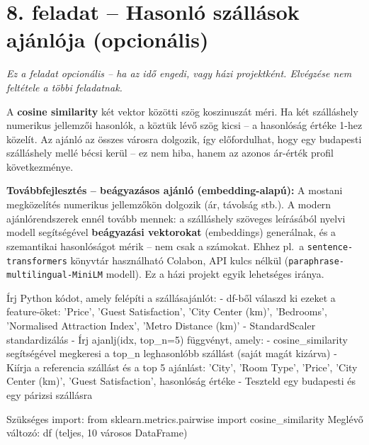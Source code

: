\documentclass[11pt,a4paper]{article}
\begin{document}
\section{8. feladat -- Hasonló szállások ajánlója \textnormal{\small(opcionális)}}

\noindent\textit{Ez a feladat opcionális -- ha az idő engedi, vagy házi projektként. Elvégzése nem feltétele a többi feladatnak.}

\smallskip
\noindent A \textbf{cosine similarity} két vektor közötti szög koszinuszát méri.
Ha két szálláshely numerikus jellemzői hasonlók,
a köztük lévő szög kicsi -- a hasonlóság értéke 1-hez közelít.
Az ajánló az összes városra dolgozik, így előfordulhat,
hogy egy budapesti szálláshely mellé bécsi kerül -- ez nem hiba,
hanem az azonos ár-érték profil következménye.

\begin{tcolorbox}[tipstyle]
\textbf{\textcolor{tipborder}{Továbbfejlesztés -- beágyazásos ajánló (embedding-alapú):}}
A mostani megközelítés numerikus jellemzőkön dolgozik (ár, távolság stb.).
A modern ajánlórendszerek ennél tovább mennek: a szálláshely szöveges leírásából
nyelvi modell segítségével \textbf{beágyazási vektorokat} (embeddings) generálnak,
és a szemantikai hasonlóságot mérik -- nem csak a számokat.
Ehhez pl.\ a \texttt{sentence-transformers} könyvtár használható Colabon,
API kulcs nélkül (\texttt{paraphrase-multilingual-MiniLM} modell).
Ez a házi projekt egyik lehetséges iránya.
\end{tcolorbox}

\begin{prompt}
Írj Python kódot, amely felépíti a szállásajánlót:
- df-ből válaszd ki ezeket a feature-öket:
  'Price', 'Guest Satisfaction', 'City Center (km)',
  'Bedrooms', 'Normalised Attraction Index', 'Metro Distance (km)'
- StandardScaler standardizálás
- Írj ajanlj(idx, top_n=5) függvényt, amely:
  - cosine_similarity segítségével megkeresi a top_n
    leghasonlóbb szállást (saját magát kizárva)
  - Kiírja a referencia szállást és a top 5 ajánlást:
    'City', 'Room Type', 'Price', 'City Center (km)',
    'Guest Satisfaction', hasonlóság értéke
- Teszteld egy budapesti és egy párizsi szállásra

Szükséges import: from sklearn.metrics.pairwise import cosine_similarity
Meglévő változó: df (teljes, 10 városos DataFrame)
\end{prompt}
\end{document}
